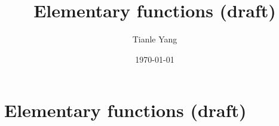 \documentclass{noteformyself}
\title{Elementary functions (draft)}
\author{Tianle Yang}
\date{\today}
\begin{document}
    \maketitle

    \section{Elementary functions (draft)}



\end{document}
